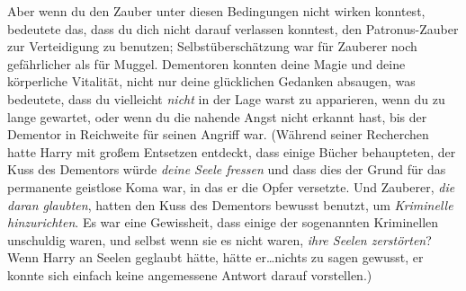 Aber wenn du den Zauber unter diesen Bedingungen nicht wirken konntest, bedeutete das, dass du dich nicht darauf verlassen konntest, den Patronus-Zauber zur Verteidigung zu benutzen; Selbstüberschätzung war für Zauberer noch gefährlicher als für Muggel. Dementoren konnten deine Magie und deine körperliche Vitalität, nicht nur deine glücklichen Gedanken absaugen, was bedeutete, dass du vielleicht \emph{nicht} in der Lage warst zu apparieren, wenn du zu lange gewartet, oder wenn du die nahende Angst nicht erkannt hast, bis der Dementor in Reichweite für seinen Angriff war. (Während seiner Recherchen hatte Harry mit großem Entsetzen entdeckt, dass einige Bücher behaupteten, der Kuss des Dementors würde \emph{deine Seele fressen} und dass dies der Grund für das permanente geistlose Koma war, in das er die Opfer versetzte. Und Zauberer, \emph{die daran glaubten}, hatten den Kuss des Dementors bewusst benutzt, um \emph{Kriminelle hinzurichten}. Es war eine Gewissheit, dass einige der sogenannten Kriminellen unschuldig waren, und selbst wenn sie es nicht waren, \emph{ihre Seelen zerstörten}? Wenn Harry an Seelen geglaubt hätte, hätte er…nichts zu sagen gewusst, er konnte sich einfach keine angemessene Antwort darauf vorstellen.)

